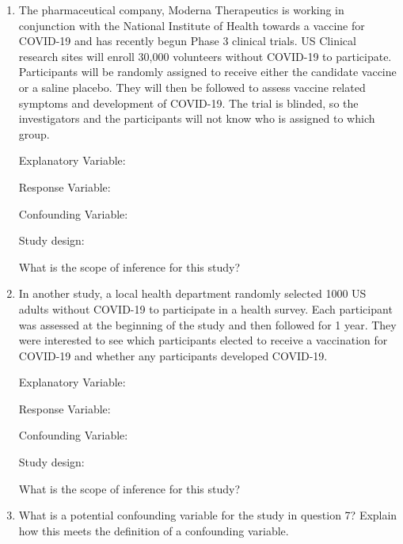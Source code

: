 \documentclass[
]{report}
\begin{document}
\begin{enumerate}
\def\labelenumi{\arabic{enumi}.}
\setcounter{enumi}{5}
\item
  The pharmaceutical company, Moderna Therapeutics is working in conjunction with the National Institute of Health towards a vaccine for COVID-19 and has recently begun Phase 3 clinical trials. US Clinical research sites will enroll 30,000 volunteers without COVID-19 to participate. Participants will be randomly assigned to receive either the candidate vaccine or a saline placebo. They will then be followed to assess vaccine related symptoms and development of COVID-19. The trial is blinded, so the investigators and the participants will not know who is assigned to which group.
  \vspace{0.25in}

  Explanatory Variable:
  \vspace{0.25in}

  Response Variable:
  \vspace{0.25in}

  Confounding Variable:
  \vspace{0.25in}

  Study design:
  \vspace{0.25in}

  What is the scope of inference for this study?
  \vspace{0.5in}
\item
  In another study, a local health department randomly selected 1000 US adults without COVID-19 to participate in a health survey. Each participant was assessed at the beginning of the study and then followed for 1 year. They were interested to see which participants elected to receive a vaccination for COVID-19 and whether any participants developed COVID-19.
  \vspace{0.25in}

  Explanatory Variable:
  \vspace{0.25in}

  Response Variable:
  \vspace{0.25in}

  Confounding Variable:
  \vspace{0.25in}

  Study design:
  \vspace{0.25in}

  What is the scope of inference for this study?
  \vspace{0.5in}
\item
  What is a potential confounding variable for the study in question 7? Explain how this meets the definition of a confounding variable.
  \vspace{1in}
\end{enumerate}
\end{document}
